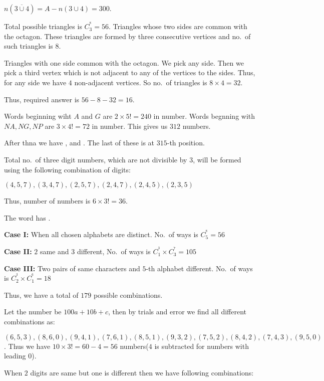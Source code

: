   $n\left(\overline{3\cup 4}\right) = A - n(3\cup 4) = 300$.
\item Total possible triangles is $C_3^^8 = 56$. Triangles whose two sides are common with the
  octagon. These triangles are formed by three consecutive vertices and no.\ of such triangles is $8$.

  Triangles with one side common with the octagon. We pick any side. Then we pick a third vertex which is
  not adjacent to any of the vertices to the sides. Thus, for any side we have $4$ non-adjacent vertices. So
  no.\ of triangles is $8\times 4 = 32$.

  Thus, required answer is $56 - 8 - 32 = 16$.
\item Words beginning wiht $A$ and $G$ are $2\times5! = 240$ in number. Words begnning with $NA, NG, NP$ are
  $3\times4! = 72$ in number. This gives us $312$ numbers.

  After thna we have ,  and . The last of these is at $315$-th
  position.
\item Total no.\ of three digit numbers, which are not divisible by $3$, will be formed using the following
  combination of digits:

  $(4, 5, 7), (3, 4, 7), (2, 5, 7), (2, 4, 7), (2, 4, 5), (2, 3, 5)$

  Thus, number of numbers is $6\times3! = 36$.
\item The word has .

  {\bf Case I:} When all chosen alphabets are distinct. No.\ of ways is $C_5^^8 = 56$

  {\bf Case II:} $2$ same and $3$ different, No.\ of ways is $C_1^^3\times C_3^^7 = 105$

  {\bf Case III:} Two pairs of same characters and $5$-th alphabet different. No.\ of ways is $C_2^^3\times
  C_1^^6 = 18$

  Thus, we have a total of $179$ possible combinations.
\item Let the number be $100a + 10b + c$, then by trials and error we find all different combinations as:

  $(6, 5, 3), (8, 6, 0), (9, 4, 1), (7, 6, 1), (8, 5, 1), (9, 3, 2), (7, 5, 2), (8, 4, 2), (7, 4, 3), (9, 5,
  0)$. Thus we have $10\times3! = 60 - 4 = 56$ numbers($4$ is subtracted for numbers with leading $0$).

  When $2$ digits are same but one is different then we have following combinations:

